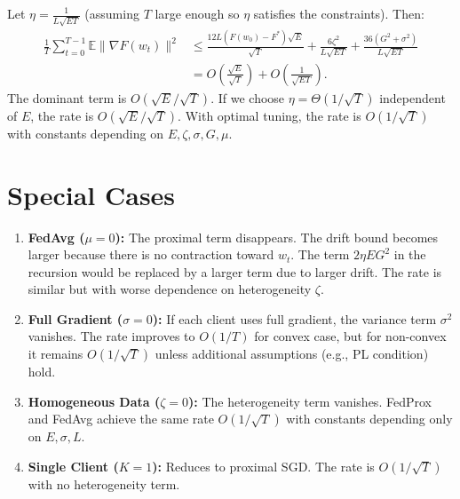 \documentclass{article}
\begin{document}
Let $\eta = \frac{1}{L \sqrt{E T}}$ (assuming $T$ large enough so $\eta$ satisfies the constraints). Then:
\begin{align}
    \frac{1}{T} \sum_{t=0}^{T-1} \mathbb{E} \| \nabla F(w_t) \|^2 &\leq \frac{12 L (F(w_0) - F^*) \sqrt{E}}{\sqrt{T}} + \frac{6 \zeta^2}{L \sqrt{E T}} + \frac{36 (G^2 + \sigma^2)}{L \sqrt{E T}} \\
    &= O\left( \frac{\sqrt{E}}{\sqrt{T}} \right) + O\left( \frac{1}{\sqrt{E T}} \right).
\end{align}
The dominant term is $O(\sqrt{E}/\sqrt{T})$. If we choose $\eta = \Theta(1/\sqrt{T})$ independent of $E$, the rate is $O(\sqrt{E}/\sqrt{T})$.
With optimal tuning, the rate is $O(1/\sqrt{T})$ with constants depending on $E, \zeta, \sigma, G, \mu$.

\section*{Special Cases}

\begin{enumerate}
    \item \textbf{FedAvg ($\mu=0$):} The proximal term disappears. The drift bound becomes larger because there is no contraction toward $w_t$. The term $2 \eta E G^2$ in the recursion would be replaced by a larger term due to larger drift. The rate is similar but with worse dependence on heterogeneity $\zeta$.
    \item \textbf{Full Gradient ($\sigma=0$):} If each client uses full gradient, the variance term $\sigma^2$ vanishes. The rate improves to $O(1/T)$ for convex case, but for non-convex it remains $O(1/\sqrt{T})$ unless additional assumptions (e.g., PL condition) hold.
    \item \textbf{Homogeneous Data ($\zeta=0$):} The heterogeneity term vanishes. FedProx and FedAvg achieve the same rate $O(1/\sqrt{T})$ with constants depending only on $E, \sigma, L$.
    \item \textbf{Single Client ($K=1$):} Reduces to proximal SGD. The rate is $O(1/\sqrt{T})$ with no heterogeneity term.
\end{enumerate}

\end{document}
